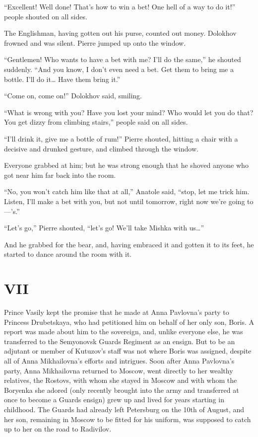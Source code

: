 ``Excellent! Well done! That's how to win a bet! One hell of a way to do it!'' people shouted on all sides.

The Englishman, having gotten out his purse, counted out money. Dolokhov frowned and was silent. Pierre jumped up onto the window.

``Gentlemen! Who wants to have a bet with me? I'll do the same,'' he shouted suddenly. ``And you know, I don't even need a bet. Get them to bring me a bottle. I'll do it\ldots{} Have them bring it.'' %

``Come on, come on!'' Dolokhov said, smiling. %

``What is wrong with you? Have you lost your mind? Who would let you do that? You get dizzy from climbing stairs,'' people said on all sides.

``I'll drink it, give me a bottle of rum!'' Pierre shouted, hitting a chair with a decisive and drunked gesture, and climbed through the window.

Everyone grabbed at him; but he was strong enough that he shoved anyone who got near him far back into the room.

``No, you won't catch him like that at all,'' Anatole said, ``stop, let me trick him. Listen, I'll make a bet with you, but not until tomorrow, right now we're going to ---'s.'' %

``Let's go,'' Pierre shouted, ``let's go! We'll take Mishka with us\ldots{}'' %

And he grabbed for the bear, and, having embraced it and gotten it to its feet, he started to dance around the room with it.

\section*{VII} %

Prince Vasily kept the promise that he made at Anna Pavlovna's party to Princess Drubetskaya, who had petitioned him on behalf of her only son, Boris. A report was made about him to the sovereign, and, unlike everyone else, he was transferred to the Semyonovsk Guards Regiment as an ensign. But to be an adjutant or member of Kutuzov's staff was not where Boris was assigned, despite all of Anna Mikhailovna's efforts and intrigues. Soon after Anna Pavlovna's party, Anna Mikhailovna returned to Moscow, went directly to her wealthy relatives, the Rostovs, with whom she stayed in Moscow and with whom the Boryenka she adored (only recently brought into the army and transferred at once to become a Guards ensign) grew up and lived for years starting in childhood. The Guards had already left Petersburg on the 10th of August, and her son, remaining in Moscow to be fitted for his uniform, was supposed to catch up to her on the road to Radivilov.

